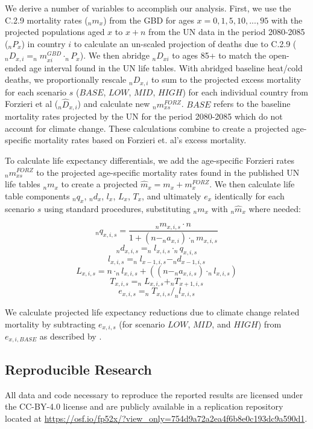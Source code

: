 \documentclass[12pt]{article}
\begin{document}
We derive a number of variables to accomplish our analysis. First, we
use the C.2.9 mortality rates (\(_nm_x\)) from the GBD for ages
\(x=0,1,5,10,...,95\) with the projected populations aged \(x\) to
\(x+n\) from the UN data in the period 2080-2085 (\(_nP_x\)) in country
\(i\) to calculate an un-scaled projection of deaths due to C.2.9
(\(_nD_{x,i}=_nm_{xi}^{GBD} \cdot _nP_x\)). We then abridge \(_nD_{xi}\)
to ages 85+ to match the open-ended age interval found in the UN life
tables. With abridged baseline heat/cold deaths, we proportionally
rescale \(_nD_{x,i}\) to sum to the projected excess mortality for each
scenario \(s\) (\(BASE\), \(LOW\), \(MID\), \(HIGH\)) for each
individual country from Forzieri et al \citep{forzieri2017increasing}
(\(_n\hat{D}_{x,i}\)) and calculate new \(_nm_{xs}^{FORZ}\). \(BASE\)
refers to the baseline mortality rates projected by the UN for the
period 2080-2085 which do not account for climate change. These
calculations combine to create a projected age-specific mortality rates
based on Forzieri et. al's excess mortality.

To calculate life expectancy differentials, we add the age-specific
Forzieri rates \(_nm_{xs}^{FORZ}\) to the projected age-specific
mortality rates found in the published UN life tables \(_nm_x\) to
create a projected \(\hat{m}_x=m_x + m_x^{FORZ}\). We then calculate
life table components \(_nq_x\), \(_nd_x\), \(l_x\), \(L_x\), \(T_x\),
and ultimately \(e_x\) identically for each scenario \(s\) using
standard procedures, substituting \(_nm_x\) with \(_n\hat{m}_x\) where
needed:

\[_nq_{x,i,s} = \frac{_nm_{x,i,s}\cdot  n}{1+(n-_na_{x,i}) \cdot _nm_{x,i,s}}\]
\[_nd_{x,i,s} = _nl_{x,i,s} \cdot _nq_{x,i,s}\]
\[l_{x,i,s} = _nl_{x-1,i,s} - _nd_{x-1,i,s}\]
\[L_{x,i,s} = n \cdot _nl_{x,i,s} + ((n-_na_{x,i,s}) \cdot _nl_{x,i,s})\]
\[T_{x,i,s} = _nL_{x,i,s} + _nT_{x+1,i,s}\]
\[e_{x,i,s} = _nT_{x,i,s} / _nl_{x,i,s}\]

We calculate projected life expectancy reductions due to climate change
related mortality by subtracting \(e_{x,i,s}\) (for scenario \(LOW\),
\(MID\), and \(HIGH\)) from \(e_{x,i,BASE}\) as described by
\citep{beltran2008integrated}.

\hypertarget{reproducible-research}{%
\subsection{Reproducible Research}\label{reproducible-research}}

All data and code necessary to reproduce the reported results are
licensed under the CC-BY-4.0 license and are publicly available in a
replication repository located at
\url{https://osf.io/fp52x/?view_only=754d9a72a2ea4f6b8e0c193dc9a590d1}.
\end{document}
